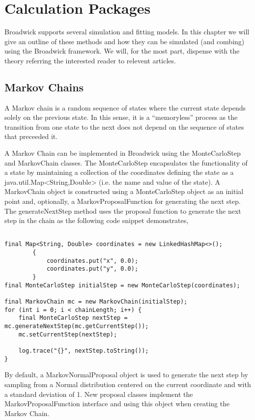 \chapter{Calculation Packages}

Broadwick supports several simulation and fitting models. In this chapter we will give an outline of these methods and how they can be simulated (and combing) using the Broadwick framework. We will, for the most part, dispense with the theory referring the interested reader to relevent articles.



\section{Markov Chains}

A Markov chain is a random sequence of states where the current state depends solely on the previous state. In this sense, it is a ``memoryless'' process as the transition from one state to the next does not depend on the sequence of states that preceeded it.

A Markov Chain can be implemented in Broadwick using the MonteCarloStep and MarkovChain classes. The MonteCarloStep encapsulates the functionality of a state by maintaining a collection of the coordinates defining the state as a java.util.Map<String,Double> (i.e. the name and value of the state). A MarkovChain object is constructed using a MonteCarloStep object as an initial point and, optionally, a MarkovProposalFunction for generating the next step. The generateNextStep method uses the proposal function to generate the next step in the chain as the following code snippet demonstrates,

\begin{lstlisting}

final Map<String, Double> coordinates = new LinkedHashMap<>();
        {
            coordinates.put("x", 0.0);
            coordinates.put("y", 0.0);
        }
final MonteCarloStep initialStep = new MonteCarloStep(coordinates);

final MarkovChain mc = new MarkovChain(initialStep);
for (int i = 0; i < chainLength; i++) {
    final MonteCarloStep nextStep = mc.generateNextStep(mc.getCurrentStep());
    mc.setCurrentStep(nextStep);

    log.trace("{}", nextStep.toString());
}
\end{lstlisting}

By default, a MarkovNormalProposal object is used to generate the next step by sampling from a Normal distribution centered on the current coordinate and with a standard deviation of 1. New proposal classes implement the MarkovProposalFunction interface and using this object when creating the Markov Chain.

